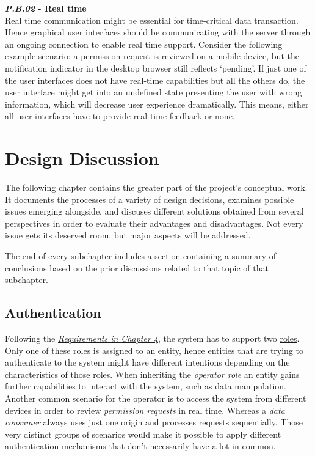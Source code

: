 \documentclass[12pt,english,a4paper,titlepage,cleardoublepage=empty,dottedtoc]{report}
\begin{document}
\textbf{\emph{\protect\hypertarget{pb02}{}{P.B.02}} - Real time}\\
Real time communication might be essential for time-critical data
transaction. Hence graphical user interfaces should be communicating
with the server through an ongoing connection to enable real time
support. Consider the following example scenario: a permission request
is reviewed on a mobile device, but the notification indicator in the
desktop browser still reflects `pending'. If just one of the user
interfaces does not have real-time capabilities but all the others do,
the user interface might get into an undefined state presenting the user
with wrong information, which will decrease user experience
dramatically. This means, either all user interfaces have to provide
real-time feedback or none.

\hypertarget{design-discussion}{\chapter{Design
Discussion}\label{design-discussion}}

The following chapter contains the greater part of the project's
conceptual work. It documents the processes of a variety of design
decisions, examines possible issues emerging alongside, and discuses
different solutions obtained from several perspectives in order to
evaluate their advantages and disadvantages. Not every issue gets its
deserved room, but major aspects will be addressed.

The end of every subchapter includes a section containing a summary of
conclusions based on the prior discussions related to that topic of that
subchapter.

\hypertarget{authentication}{\section{Authentication}\label{authentication}}

Following the \emph{\protect\hyperlink{requirements}{Requirements in
Chapter 4}}, the system has to support two
\protect\hyperlink{sa03}{roles}. Only one of these roles is assigned to
an entity, hence entities that are trying to authenticate to the system
might have different intentions depending on the characteristics of
those roles. When inheriting the \emph{operator role} an entity gains
further capabilities to interact with the system, such as data
manipulation. Another common scenario for the operator is to access the
system from different devices in order to review \emph{permission
requests} in real time. Whereas a \emph{data consumer} always uses just
one origin and processes requests sequentially. Those very distinct
groups of scenarios would make it possible to apply different
authentication mechanisms that don't necessarily have a lot in common.
\end{document}
